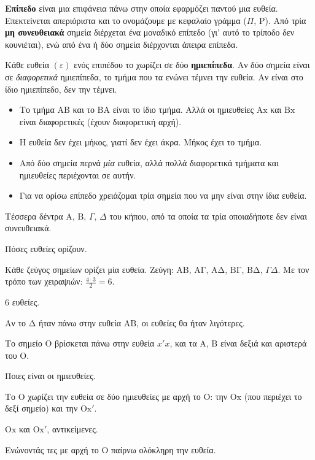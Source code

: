 
\textbf{Επίπεδο} είναι μια επιφάνεια πάνω στην οποία εφαρμόζει παντού μια ευθεία. Επεκτείνεται απεριόριστα και το ονομάζουμε με κεφαλαίο γράμμα ($\Pi$, $\mathrm{Ρ}$). Από τρία \textbf{μη συνευθειακά} σημεία διέρχεται ένα μοναδικό επίπεδο (γι' αυτό το τρίποδο δεν κουνιέται), ενώ από ένα ή δύο σημεία διέρχονται άπειρα επίπεδα.

Κάθε ευθεία $(\varepsilon)$ ενός επιπέδου το χωρίζει σε δύο \textbf{ημιεπίπεδα}. Αν δύο σημεία είναι σε \emph{διαφορετικά} ημιεπίπεδα, το τμήμα που τα ενώνει τέμνει την ευθεία. Αν είναι στο ίδιο ημιεπίπεδο, δεν την τέμνει.

\begin{prosoxi}
\begin{itemize}[leftmargin=1.2em,itemsep=0.3ex,topsep=2pt]
\item Το τμήμα $\mathrm{ΑΒ}$ και το $\mathrm{ΒΑ}$ είναι το ίδιο τμήμα. Αλλά οι ημιευθείες $\mathrm{Αx}$ και $\mathrm{Βx}$ είναι διαφορετικές (έχουν διαφορετική αρχή).
\item Η ευθεία δεν έχει μήκος, γιατί δεν έχει άκρα. Μήκος έχει το τμήμα.
\item Από δύο σημεία περνά \emph{μία} ευθεία, αλλά πολλά διαφορετικά τμήματα και ημιευθείες περιέχονται σε αυτήν.
\item Για να ορίσω επίπεδο χρειάζομαι τρία σημεία που να μην είναι στην ίδια ευθεία.
\end{itemize}
\end{prosoxi}


\tixero Τέσσερα δέντρα $\mathrm{Α},\,\mathrm{Β},\,\Gamma,\,\Delta$ του κήπου, από τα οποία τα τρία οποιαδήποτε δεν είναι συνευθειακά.\par
\tithelo Πόσες ευθείες ορίζουν.\par
\possindeo Κάθε ζεύγος σημείων ορίζει μία ευθεία. Ζεύγη: $\mathrm{ΑΒ},\,\mathrm{ΑΓ},\,\mathrm{ΑΔ},\,\mathrm{ΒΓ},\,\mathrm{ΒΔ},\,\Gamma\Delta$. Με τον τρόπο των χειραψιών: $\frac{4\cdot3}{2}=6$.\par
\apantisi $6$ ευθείες.\par
\elegxos Αν το $\mathrm{Δ}$ ήταν πάνω στην ευθεία $\mathrm{ΑΒ}$, οι ευθείες θα ήταν λιγότερες.

\tixero Το σημείο $\mathrm{Ο}$ βρίσκεται πάνω στην ευθεία $x'x$, και τα $\mathrm{Α}$, $\mathrm{Β}$ είναι δεξιά και αριστερά του $\mathrm{Ο}$.\par
\tithelo Ποιες είναι οι ημιευθείες.\par
\possindeo Το $\mathrm{Ο}$ χωρίζει την ευθεία σε δύο ημιευθείες με αρχή το $\mathrm{Ο}$: την $\mathrm{Οx}$ (που περιέχει το δεξί σημείο) και την $\mathrm{Οx'}$.\par
\apantisi $\mathrm{Οx}$ και $\mathrm{Οx'}$, αντικείμενες.\par
\elegxos Ενώνοντάς τες με αρχή το $\mathrm{Ο}$ παίρνω ολόκληρη την ευθεία.

